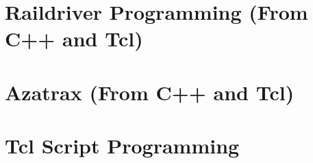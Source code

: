 \documentclass[12pt,notitlepage,twoside]{book}
\begin{document}
\lstset{language=Tcl,basicstyle=\footnotesize,numbers=left,stepnumber=5}%
\newcommand{\MRRSubTitle}{Programming Guides}

\tableofcontents
\lstlistoflistings
\listoffigures
\listoftables
\cleardoublepage
%       
\cleardoublepage
{}
%

\part{Raildriver Programming (From C++ and Tcl)}


\part{Azatrax (From C++ and Tcl)}

\part{Tcl Script Programming}













%
\cleardoublepage


\cleardoublepage
\printindex
\end{document}
